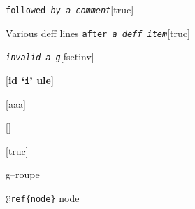 \documentclass{book}
\begin{document}
\begin{titlepage}
%
\noindent\texttt{followed \EmbracOn{}\textnormal{\textsl{by a comment}}\EmbracOff{}}\hfill[truc]



%
Various deff lines
\noindent\texttt{after \EmbracOn{}\textnormal{\textsl{a deff item}}\EmbracOff{}}\hfill[truc]



%

\noindent\texttt{\textsl{invalid} \EmbracOn{}\textnormal{\textsl{a g}}\EmbracOff{}}\hfill[fsetinv]



%
\noindent\texttt{}\hfill[\textbf{id `\texttt{i}' ule}]




\noindent\texttt{}\hfill[aaa]



\noindent\texttt{}\hfill[]



\noindent\texttt{}\hfill[truc]




g--roupe

\texttt{@ref\{node\}} node


\end{titlepage}
\end{document}
